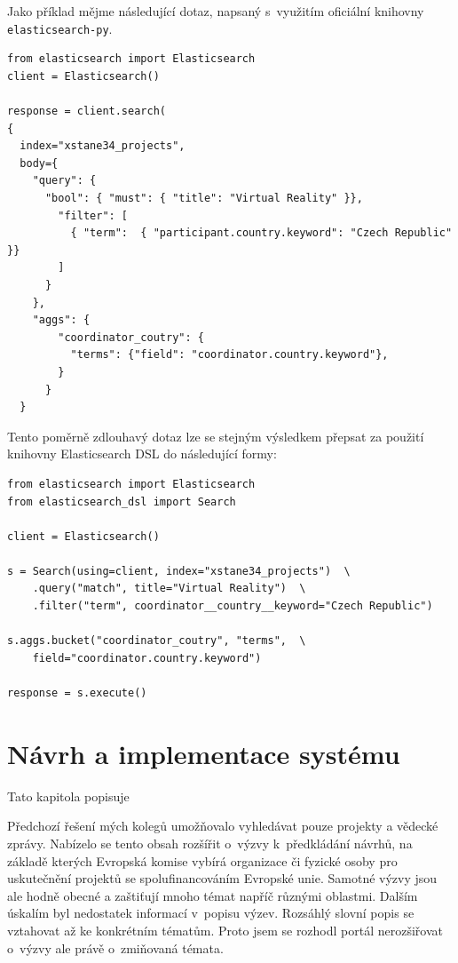 Jako příklad mějme následující dotaz, napsaný s~využitím oficiální knihovny \texttt{elasticsearch-py}.
\begin{verbatim}
from elasticsearch import Elasticsearch
client = Elasticsearch()

response = client.search(
{
  index="xstane34_projects",
  body={
    "query": { 
      "bool": { "must": { "title": "Virtual Reality" }}, 
        "filter": [ 
          { "term":  { "participant.country.keyword": "Czech Republic" }}
        ]
      }
    },
    "aggs": {
        "coordinator_coutry": {
          "terms": {"field": "coordinator.country.keyword"},
        }
      }
  }
\end{verbatim}

Tento poměrně zdlouhavý dotaz lze se stejným výsledkem přepsat za použití knihovny Elasticsearch DSL do následující formy:

\begin{verbatim}
from elasticsearch import Elasticsearch
from elasticsearch_dsl import Search

client = Elasticsearch()

s = Search(using=client, index="xstane34_projects")  \
    .query("match", title="Virtual Reality")  \
    .filter("term", coordinator__country__keyword="Czech Republic")

s.aggs.bucket("coordinator_coutry", "terms",  \
    field="coordinator.country.keyword")

response = s.execute()
\end{verbatim}

\blindtext[2]





\chapter{Návrh a implementace systému}
Tato kapitola popisuje \blindtext

Předchozí řešení mých kolegů umožňovalo vyhledávat pouze projekty a vědecké zprávy. Nabízelo se tento obsah rozšířit o~výzvy k~předkládání návrhů, na základě kterých Evropská komise vybírá organizace či fyzické osoby pro uskutečnění projektů se spolufinancováním Evropské unie.
Samotné výzvy jsou ale hodně obecné a zaštiťují mnoho témat napříč různými oblastmi. Dalším úskalím byl nedostatek informací v~popisu výzev. Rozsáhlý slovní popis se vztahovat až ke konkrétním tématům. Proto jsem se rozhodl portál nerozšiřovat o~výzvy ale právě o~zmiňovaná témata.


